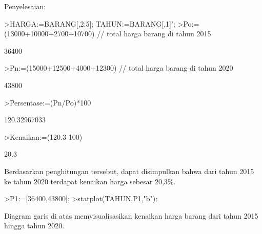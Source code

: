 \documentclass[a4paper,10pt]{article}
\begin{document}
\begin{eulernotebook}
\begin{eulercomment}
\begin{eulercomment}
\begin{eulercomment}
\begin{eulercomment}
\begin{eulercomment}
\begin{eulercomment}
\begin{eulercomment}
\begin{eulercomment}
\begin{eulercomment}
\begin{eulercomment}
\begin{eulercomment}
\begin{eulercomment}
\begin{eulercomment}
\begin{eulercomment}
\begin{eulercomment}
\begin{eulercomment}
\begin{eulercomment}
\begin{eulercomment}
\begin{eulercomment}
Penyelesaian:
\end{eulercomment}
\begin{eulerprompt}
>HARGA:=BARANG[,2:5]; TAHUN:=BARANG[,1]';
>Po:=(13000+10000+2700+10700) // total harga barang di tahun 2015
\end{eulerprompt}
\begin{euleroutput}
  36400
\end{euleroutput}
\begin{eulerprompt}
>Pn:=(15000+12500+4000+12300) // total harga barang di tahun 2020
\end{eulerprompt}
\begin{euleroutput}
  43800
\end{euleroutput}
\begin{eulerprompt}
>Persentase:=(Pn/Po)*100
\end{eulerprompt}
\begin{euleroutput}
  120.32967033
\end{euleroutput}
\begin{eulerprompt}
>Kenaikan:=(120.3-100)
\end{eulerprompt}
\begin{euleroutput}
  20.3
\end{euleroutput}
\begin{eulercomment}
Berdasarkan penghitungan tersebut, dapat disimpulkan bahwa dari tahun
2015 ke tahun 2020 terdapat kenaikan harga sebesar 20,3\%.
\end{eulercomment}
\begin{eulerprompt}
>P1:=[36400,43800];
>statplot(TAHUN,P1,"b"):
\end{eulerprompt}
\begin{eulercomment}
Diagram garis di atas memvisualisasikan kenaikan harga barang dari
tahun 2015 hingga tahun 2020.
\end{eulercomment}
\begin{eulercomment}


\end{eulercomment}
\end{eulercomment}
\end{eulercomment}
\end{eulercomment}
\end{eulercomment}
\end{eulercomment}
\end{eulercomment}
\end{eulercomment}
\end{eulercomment}
\end{eulercomment}
\end{eulercomment}
\end{eulercomment}
\end{eulercomment}
\end{eulercomment}
\end{eulercomment}
\end{eulercomment}
\end{eulercomment}
\end{eulercomment}
\end{eulercomment}
\end{eulernotebook}
\end{document}
